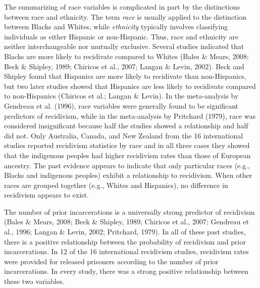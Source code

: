 The summarizing of race variables is complicated in part by the distinctions between race and ethnicity.  The term \emph{race} is usually applied to the distinction between Blacks and Whites, while \emph{ethnicity} typically involves classifying individuals as either Hispanic or non-Hispanic.  Thus, race and ethnicity are neither interchangeable nor mutually exclusive.  Several studies indicated that Blacks are more likely to recidivate compared to Whites (Bales \& Mears, 2008; Beck \& Shipley, 1989; Chiricos et al., 2007; Langan \& Levin, 2002).  Beck and Shipley found that Hispanics are more likely to recidivate than non-Hispanics, but two later studies showed that Hispanics are less likely to recidivate compared to non-Hispanics (Chiricos et al.; Langan \& Levin).  In the meta-analysis by Gendreau et al. (1996), race variables were generally found to be significant predictors of recidivism, while in the meta-analysis by Pritchard (1979), race was considered insignificant because half the studies showed a relationship and half did not.  Only Australia, Canada, and New Zealand from the 16 international studies reported recidivism statistics by race and in all three cases they showed that the indigenous peoples had higher recidivism rates than those of European ancestry.  The past evidence appears to indicate that only particular races (e.g., Blacks and indigenous peoples) exhibit a relationship to recidivism.  When other races are grouped together (e.g., Whites and Hispanics), no difference in recidivism appears to exist.

The number of prior incarcerations is a universally strong predictor of recidivism (Bales \& Mears, 2008; Beck \& Shipley, 1989; Chiricos et al., 2007; Gendreau et al., 1996; Langan \& Levin, 2002; Pritchard, 1979).  In all of these past studies, there is a positive relationship between the probability of recidivism and prior incarcerations.  In 12 of the 16 international recidivism studies, recidivism rates were provided for released prisoners according to the number of prior incarcerations.  In every study, there was a strong positive relationship between these two variables.


